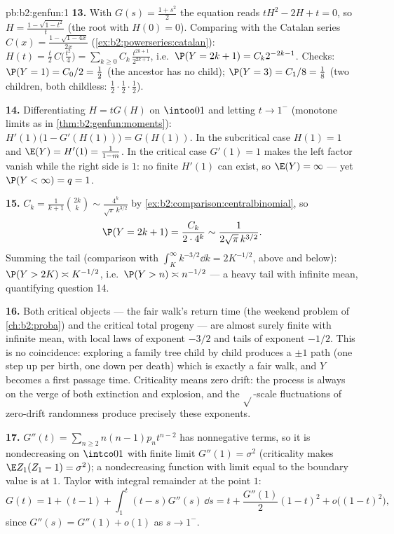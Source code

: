 \begin{solution}{pb:b2:genfun:1}
\textbf{13.} With $G(s) = \frac{1 + s^2}2$ the equation reads
$tH^2 - 2H + t = 0$, so $H = \frac{1 - \sqrt{1 - t^2}}{t}$
(the root with $H(0) = 0$). Comparing with the Catalan series
$C(x) = \frac{1 - \sqrt{1 - 4x}}{2x}$
(\cref{ex:b2:powerseries:catalan}): $H(t) = \frac
t2\,C\bigl(\frac{t^2}4\bigr) =
\sum_{k\geq0}C_k\,\frac{t^{2k+1}}{2^{2k+1}}$, i.e.\ $\P(Y =
2k+1) = C_k2^{-2k-1}$. Checks: $\P(Y = 1) = C_0/2 = \frac12$
(the ancestor has no child); $\P(Y = 3) = C_1/8 = \frac18$
(two children, both childless: $\frac12\cdot\frac12\cdot
\frac12$).

\textbf{14.} Differentiating $H = tG(H)$ on $\intoo01$ and
letting $t \to 1^-$ (monotone limits as in
\cref{thm:b2:genfun:moments}): $H'(1)\bigl(1 - G'(H(1))\bigr)
= G(H(1))$. In the subcritical case $H(1) = 1$ and $\E(Y) =
H'(1) = \frac1{1 - m}$. In the critical case $G'(1) = 1$
makes the left factor vanish while the right side is $1$: no
finite $H'(1)$ can exist, so $\E(Y) = \infty$ --- yet $\P(Y <
\infty) = q = 1$.

\textbf{15.} $C_k = \frac1{k+1}\binom{2k}k \sim
\frac{4^k}{\sqrt\pi\,k^{3/2}}$ by
\cref{ex:b2:comparison:centralbinomial}, so
\[
\P(Y = 2k+1) = \frac{C_k}{2\cdot4^{k}} \sim
\frac1{2\sqrt\pi\,k^{3/2}} .
\]
Summing the tail (comparison with $\int_K^\infty
k^{-3/2}\dd k = 2K^{-1/2}$, above and below): $\P(Y > 2K)
\asymp K^{-1/2}$, i.e.\ $\P(Y > n) \asymp n^{-1/2}$ --- a
heavy tail with infinite mean, quantifying question 14.

\textbf{16.} Both critical objects --- the fair walk's return
time (the weekend problem of \cref{ch:b2:proba}) and the
critical total progeny --- are almost surely finite with
infinite mean, with local laws of exponent $-3/2$ and tails
of exponent $-1/2$. This is no coincidence: exploring a
family tree child by child produces a $\pm1$ path (one step
up per birth, one down per death) which is exactly a fair
walk, and $Y$ becomes a first passage time. Criticality means
zero drift: the process is always on the verge of both
extinction and explosion, and the $\sqrt{}$-scale
fluctuations of zero-drift randomness produce precisely these
exponents.

\textbf{17.} $G''(t) = \sum_{n\geq2}n(n-1)p_nt^{n-2}$ has
nonnegative terms, so it is nondecreasing on $\intco01$ with
finite limit $G''(1) = \sigma^2$ (criticality makes
$\E Z_1(Z_1 - 1) = \sigma^2$); a nondecreasing function with
limit equal to the boundary value is  at $1$.
Taylor with integral remainder at the point $1$:
\[
G(t) = 1 + (t - 1) + \int_1^t(t - s)G''(s)\,\dd s
= t + \frac{G''(1)}2(1-t)^2 + o\bigl((1-t)^2\bigr),
\]
since $G''(s) = G''(1) + o(1)$ as $s \to 1^-$.


\end{solution}
